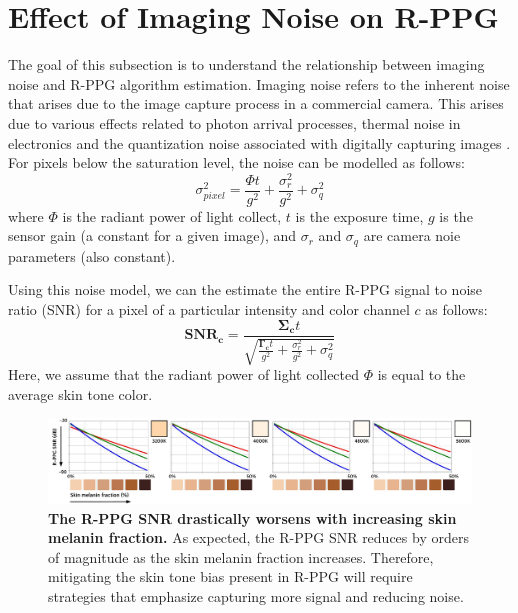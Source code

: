 \section{Effect of Imaging Noise on R-PPG}\label{sec:effect_noise_RPPG}

The goal of this subsection is to understand the relationship between imaging noise and R-PPG algorithm estimation. Imaging noise refers to the inherent noise that arises due to the image capture process in a commercial camera. This arises due to various effects related to photon arrival processes, thermal noise in electronics and the quantization noise associated with digitally capturing images \cite{hasinoff_noise-optimal_2010}. For
pixels below the saturation level, the noise can be modelled as follows: 
\begin{equation} \label{eqn:imaging_noise_model}
    \sigma_{pixel}^2 = \frac{\Phi t}{g^2} + \frac{\sigma_{r}^2}{g^2} + \sigma_{q}^2
\end{equation}
where $\Phi$ is the radiant power of light collect, $t$ is the exposure time, $g$ is the sensor gain (a constant for a given image), and $\sigma_r$ and $\sigma_q$ are camera noie parameters (also constant). 

Using this noise model, we can the estimate the entire R-PPG signal to noise ratio (SNR) for a pixel of a particular intensity and color channel $c$ as follows:
\begin{equation} \label{eqn:SNR_rPPG}
    \mathbf{SNR_c} = \frac{\mathbf{\boldsymbol\Sigma_{c}}t}{\sqrt{\frac{\mathbf{\boldsymbol\Gamma_{c}}t}{g^2} + \frac{\sigma_{r}^2}{g^2} + \sigma_{q}^2}}
\end{equation}
Here, we assume that the radiant power of light collected $\Phi$ is equal to the average skin tone color. 

\begin{figure}[t]
    \centering
    \includegraphics[width=\linewidth]{include/fig_SNR_dB.pdf}
    \caption{\textbf{The R-PPG SNR drastically worsens with increasing skin melanin fraction.} As expected, the R-PPG SNR reduces by orders of magnitude as the skin melanin fraction increases. Therefore, mitigating the skin tone bias present in R-PPG will require strategies that emphasize capturing more signal and reducing noise.}
    \label{fig:SNR_theory}
\end{figure}

